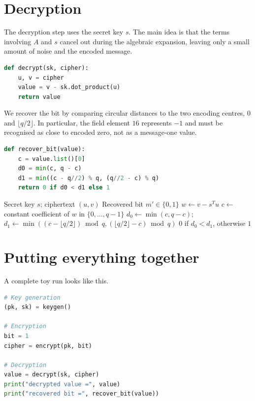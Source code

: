 \section{Decryption}

The decryption step uses the secret key $s$. The main idea is that the terms involving $A$ and $s$ cancel out during the algebraic expansion, leaving only a small amount of noise and the encoded message.

\begin{lstlisting}[language=Python]
def decrypt(sk, cipher):
    u, v = cipher
    value = v - sk.dot_product(u)
    return value
\end{lstlisting}

We recover the bit by comparing circular distances to the two encoding centres, $0$ and $\lfloor q/2\rfloor$. In particular, the field element $16$ represents $-1$ and must be recognised as close to encoded zero, not as a message-one value.

\begin{lstlisting}[language=Python]
def recover_bit(value):
    c = value.list()[0]
    d0 = min(c, q - c)
    d1 = min((c - q//2) % q, (q//2 - c) % q)
    return 0 if d0 < d1 else 1
\end{lstlisting}

\begin{algorithm}[H]
\caption{Toy Decrypt}
\label{alg:toy-decrypt}
\begin{algorithmic}[1]
\Require Secret key $s$; ciphertext $(u,v)$
\Ensure Recovered bit $m' \in \{0,1\}$
\State $w \gets v - s^{T} u$ 
\State $c \gets$ constant coefficient of $w$ in $\{0,\ldots,q-1\}$
\State $d_0 \gets \min(c,q-c)$; \quad $d_1 \gets \min((c-\lfloor q/2\rfloor)\bmod q,(\lfloor q/2\rfloor-c)\bmod q)$
\State \Return $0$ if $d_0<d_1$, otherwise $1$
\end{algorithmic}
\end{algorithm}

\section{Putting everything together}

A complete toy run looks like this.

\begin{lstlisting}[language=Python]
# Key generation
(pk, sk) = keygen()

# Encryption
bit = 1
cipher = encrypt(pk, bit)

# Decryption
value = decrypt(sk, cipher)
print("decrypted value =", value)
print("recovered bit =", recover_bit(value))
\end{lstlisting}

